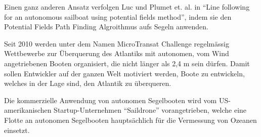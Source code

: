 Einen ganz anderen Ansatz verfolgen Luc und Plumet et. al. in \enquote{Line following for an autonomous sailboat using potential fields method}, indem sie den Potential Fields Path Finding Algroithmus aufs Segeln anwenden. \cite{inproceedings}

Seit 2010 werden unter dem Namen MicroTransat Challenge regelmässig Wettbewerbe zur Überquerung des Atlantiks mit autonomen, vom Wind angetriebenen Booten organisiert, die nicht länger als 2,4 m sein dürfen. 
Damit sollen Entwickler auf der ganzen Welt motiviert werden, Boote zu entwickeln, welches in der Lage sind, den Atlantik zu überqueren. \cite{noauthor_microtransat_nodate}

Die kommerzielle Anwendung von autonomen Segelbooten wird vom US-amerikanischen 
Startup-Unternehmen \enquote{Saildrone} vorangetrieben, welche eine Flotte an autonomen Segelbooten hauptsächlich für die Vermessung von Ozeanen einsetzt. \cite{noauthor_saildrone_nodate}